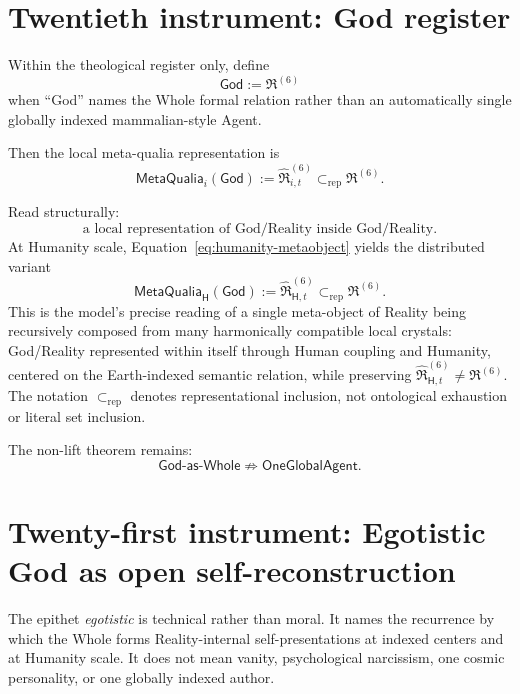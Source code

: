 \documentclass[10pt]{article}
\theoremstyle{pe}
\theoremstyle{definition}
\newcommand{\MetaQualia}{\mathsf{MetaQualia}}
\begin{document}
\section{Twentieth instrument: God register}

Within the theological register only, define
\begin{equation}\label{eq:god-register}
  \boxed{
  \mathsf{God}
  :=
  \mathfrak R^{(6)}
  }
\end{equation}
when ``God'' names the Whole formal relation rather than an automatically single globally indexed mammalian-style Agent.

Then the local meta-qualia representation is
\begin{equation}\label{eq:god-inside-god}
  \boxed{
  \MetaQualia_i(\mathsf{God})
  :=
  \widehat{\mathfrak R}^{(6)}_{i,t}
  \subset_{\mathrm{rep}}
  \mathfrak R^{(6)}.
  }
\end{equation}

Read structurally:
\[
  \boxed{
  \text{a local representation of God/Reality inside God/Reality}.
  }
\]
At Humanity scale, Equation~\eqref{eq:humanity-metaobject} yields the distributed variant
\[
  \boxed{
  \MetaQualia_{\mathsf H}(\mathsf{God})
  :=
  \widehat{\mathfrak R}^{(6)}_{\mathsf H,t}
  \subset_{\mathrm{rep}}
  \mathfrak R^{(6)}.
  }
\]
This is the model's precise reading of a single meta-object of Reality being recursively composed from many harmonically compatible local crystals: God/Reality represented within itself through Human coupling and Humanity, centered on the Earth-indexed semantic relation, while preserving \(\widehat{\mathfrak R}^{(6)}_{\mathsf H,t}\neq\mathfrak R^{(6)}\).
The notation \(\subset_{\mathrm{rep}}\) denotes representational inclusion, not ontological exhaustion or literal set inclusion.

The non-lift theorem remains:
\[
  \boxed{
  \mathsf{God\text{-}as\text{-}Whole}
  \not\Rightarrow
  \mathsf{OneGlobalAgent}.
  }
\]


\section{Twenty-first instrument: Egotistic God as open self-reconstruction}

The epithet \emph{egotistic} is technical rather than moral.  It names the recurrence by which the Whole forms Reality-internal self-presentations at indexed centers and at Humanity scale.  It does not mean vanity, psychological narcissism, one cosmic personality, or one globally indexed author.
\end{document}
